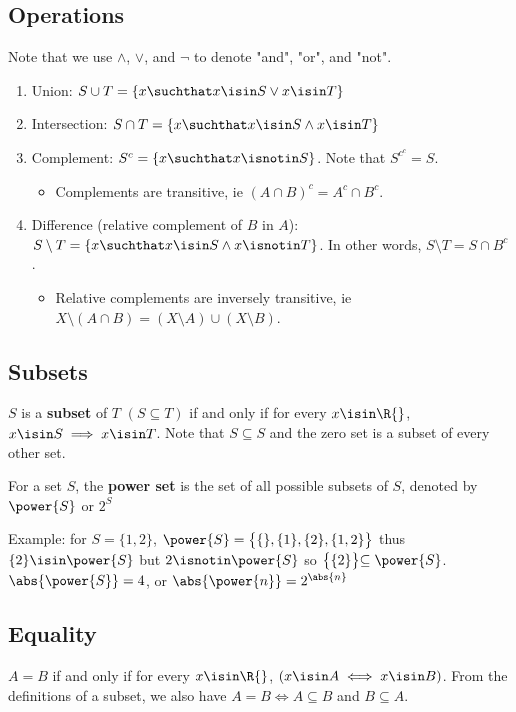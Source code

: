 \documentclass[12pt]{article}
\begin{document}
\subsection*{Operations}
Note that we use $\land$, $\lor$, and $\neg$ to denote "and", "or", and "not".
\begin{enumerate}
\item Union: $S \cup T = \{ x \suchthat x \isin S \lor x \isin T \}$
\item Intersection: $S \cap T = \{ x \suchthat x \isin S \land x \isin T \}$
\item Complement: $S^c = \{ x \suchthat x \isnotin S \}$. Note that $S^{c^c} = S$.
\begin{itemize}
\item Complements are transitive, ie $(A \cap B)^c = A^c \cap B^c$.
\end{itemize}
\item Difference (relative complement of $B$ in $A$): $S \setminus T = \{ x \suchthat x \isin S \land x \isnotin T \}$. In other words, $S \setminus T = S \cap B^c$.
\begin{itemize}
\item Relative complements are inversely transitive, ie $X \setminus (A \cap B) = (X \setminus A) \cup (X \setminus B)$.
\end{itemize}
\end{enumerate}

\subsection*{Subsets}
 $S$ is a {\bf subset} of $T$ $(S \subseteq T)$ if and only if for every $x \isin \R{}$, $x \isin S \implies x \isin T$. Note that $S \subseteq S$ and the zero set is a subset of every other set.

For a set $S$, the {\bf power set} is the set of all possible subsets of $S$, denoted by $\power{S}$ or $2^S$

Example: for $S = \{ 1,2 \}$, $\power{S} = \bigl\{ \{\}, \{1\}, \{2\}, \{1,2\} \bigl\}$ thus $\{2\} \isin \power{S}$ but $2 \isnotin \power{S}$ so $\bigl\{ \{2\} \bigl\} \subseteq \power{S}$. $\abs{\power{S}} = 4$, or $\abs{\power{n}} = 2^{\abs{n}}$

\subsection*{Equality}
$A = B$ if and only if for every $x \isin \R{}$, $(x \isin A \iff x \isin B)$. From the definitions of a subset, we also have $A = B \iff A \subseteq B$ and $B \subseteq A$.
\end{document}
